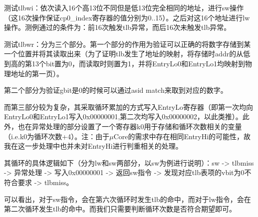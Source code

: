\documentclass[11pt,utf8]{article}
\begin{document}
{{{测试tlbwi：依次读入16个高13位不同但是低13位完全相同的地址，进行sw操作（这16次操作保证cp0\_index寄存器的值分别为0..15）。之后对这16个地址进行lw操作。测例通过的条件为：前16次触发tlb异常，而后16次未触发tlb异常。

测试tlbwr：分为三个部分。第一个部分的作用为验证可以正确的将数字存储到某一个位置并将其读取出来（为了证明tlb发生了地址的映射，将存储时addr的从低到高的第13个bit置为0，而读取时则置为1，并将EntryLo0和EntryLo1均映射到物理地址的第一页）。

第二个部分为验证gbit是0的时候可以通过asid match来取到对应的数字。

而第三部分较为复杂，其采取循环累加的方式写入EntryLo寄存器（即第一次均向EntryLo0和EntryLo1写入0x00000001,第二次均写入0x00000002，以此类推）。此外，也在异常处理的部分设置了一个寄存器k0用于存储和循环次数相关的变量（i.e.k0为循环次数+4）。注：由于$\mu$Core的需求中存在相同EntryHi的可能性，故我在这一步处理中也并未对EntryHi进行判重相关的处理。

其循环的具体逻辑如下（分为lw和sw两部分，以sw为例进行说明）：sw -> tlbmiss -> 异常处理 -> 写入0x00000001 -> 返回sw指令 -> 发现对应tlb表项的vbit为0不符合要求 -> tlbmiss。

可以看出，对于sw指令，会在第六次循环时发生tlb的命中，而对于lw指令，会在第二次循环发生tlb的命中。而我们只需要判断循环次数是否符合期望即可。

}}}
\end{document}
